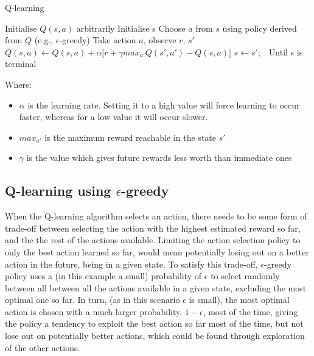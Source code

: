 \documentclass[11pt]{article}
\begin{document}
\begin{algorithm}
\caption{Q-learning}
\begin{algorithmic}[1]
\label{algQ}
\STATE Initialise $Q(s,a)$ arbitrarily
\STATE Initialise s
\STATE Choose $a$ from $s$ using policy derived from $Q$ (e.g., $\epsilon$-greedy)
\STATE Take action $a$, observe $r$, $s'$
\STATE $Q(s,a) \leftarrow Q(s,a) + \alpha \lbrack r + \gamma max_{a'} Q(s',a') - Q(s,a)\rbrack$
\STATE $s \leftarrow s';$\
\ENDFOR
\STATE Until s is terminal
\ENDFOR
\end{algorithmic}
\end{algorithm}

\noindent Where:
\begin{itemize}
	\item $\alpha$ is the learning rate. Setting it to a high value will force learning to occur faster, whereas for a low value it will occur slower.
	\item $max_{a'}$ is the maximum reward reachable in the state $s'$
	\item $\gamma$ is the value which gives future rewards less worth than immediate ones
\end{itemize}
\vspace*{10mm}


\subsection{Q-learning using $\epsilon$-greedy}

When the Q-learning algorithm selects an action, there needs to be some form of trade-off between selecting the action with the highest estimated reward so far, and the the rest of the actions available. Limiting the action selection policy to only the best action learned so far, would mean potentially losing out  on a better action in the future, being in a given state. To satisfy this trade-off, $\epsilon$-greedy policy uses a (in this example a small) probability of $\epsilon$ to select randomly between all  between all the actions available in a given state, excluding the most optimal one so far. In turn, (as in this scenario $\epsilon$ is small), the most optimal action is chosen with a much larger probability, $1-\epsilon$, most of the time, giving the policy a tendency to exploit the best action so far most of the time, but not lose out on potentially better actions, which could be found through exploration of the other actions. 
\end{document}
